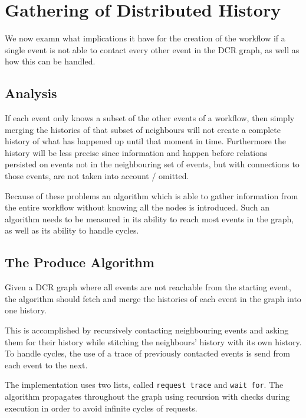 \chapter{Gathering of Distributed History}
\label{chap:gathering-distributed-history}
	
	
	
	We now examn what implications it have for the creation of the workflow if a single event is not able to contact every other event in the DCR graph, as well as how this can be handled.
	
	\section{Analysis}
	If each event only knows a subset of the other events of a workflow, then simply merging the histories of that subset of neighbours will not create a complete history of what has happened up until that moment in time. Furthermore the history will be less precise since information and happen before relations persisted on events not in the neighbouring set of events, but with connections to those events, are not taken into account / omitted.
	
	Because of these problems an algorithm which is able to gather information from the entire workflow without knowing all the nodes is introduced. Such an algorithm needs to be measured in its ability to reach most events in the graph, as well as its ability to handle cycles. 
	
	\section{The Produce Algorithm}
	Given a DCR graph where all events are not reachable from the starting event, the algorithm should fetch and merge the histories of each event in the graph into one history.
	
	This is accomplished by recursively contacting neighbouring events and asking them for their history while stitching the neighbours' history with its own history. To handle cycles, the use of a trace of previously contacted events is send from each event to the next.
	
	\newpar The implementation uses two lists, called \texttt{request trace} and \texttt{wait for}.
	The algorithm propagates throughout the graph using recursion with checks during execution in order to avoid infinite cycles of requests. 
	
